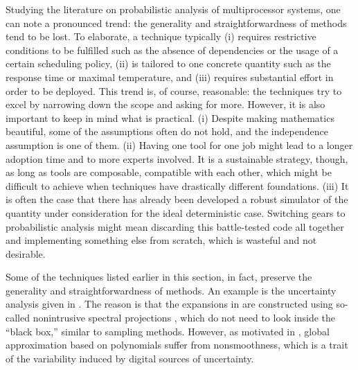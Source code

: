 Studying the literature on probabilistic analysis of multiprocessor systems, one
can note a pronounced trend: the generality and straightforwardness of 
methods tend to be lost. To elaborate, a technique typically (i) requires
restrictive conditions to be fulfilled such as the absence of dependencies or
the usage of a certain scheduling policy, (ii) is tailored to one concrete
quantity such as the response time or maximal temperature, and (iii) requires
substantial effort in order to be deployed. This trend is, of course,
reasonable: the techniques try to excel by narrowing down the scope and asking
for more. However, it is also important to keep in mind what is practical. (i)
Despite making mathematics beautiful, some of the assumptions often do not hold,
and the independence assumption is one of them. (ii) Having one tool for one job
might lead to a longer adoption time and to more experts involved. It is a
sustainable strategy, though, as long as tools are composable, compatible with
each other, which might be difficult to achieve when techniques have drastically
different foundations. (iii) It is often the case that there has already been
developed a robust simulator of the quantity under consideration for the ideal
deterministic case. Switching gears to probabilistic analysis might mean
discarding this battle-tested code all together and implementing something else
from scratch, which is wasteful and not desirable.

Some of the techniques listed earlier in this section, in fact, preserve the
generality and straightforwardness of  methods. An example is the
uncertainty analysis given in \cite{ukhov2015}. The reason is that the 
expansions in \cite{ukhov2015} are constructed using so-called nonintrusive
spectral projections \cite{xiu2010}, which do not need to look inside the
``black box,'' similar to sampling methods. However, as motivated in
, global approximation based on polynomials suffer from
nonsmoothness, which is a trait of the variability induced by digital sources of
uncertainty.
